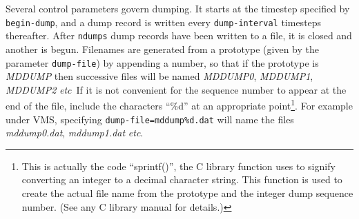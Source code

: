 \documentclass[twoside]{report}
\newcommand{\etc}{{\em etc}}
\begin{document}
Several control parameters govern dumping. It starts at the timestep
specified by \texttt{begin-dump}, and a dump record is written every
\texttt{dump-interval} timesteps thereafter.  After \texttt{ndumps} dump
records have been written to a file, it is closed and another is
begun. Filenames are generated from a prototype (given by the
parameter \texttt{dump-file}) by appending a number, so that if the
prototype is {\em MDDUMP\/} then successive files will be named
{\em MDDUMP0}, {\em MDDUMP1}, {\em MDDUMP2} \etc\
If it is not convenient for the sequence number to appear at the end
of the file, include the characters ``\%d'' at an appropriate
point\footnote{This is actually the code ``sprintf()'', the C library
function uses to signify converting an integer to a decimal character
string. This function is used to create the actual file name from the
prototype and the integer dump sequence number. (See any C library
manual for details.)}.  For example under VMS, specifying
\texttt{dump-file=mddump\%d.dat} will name the files {\em mddump0.dat},
{\em mddump1.dat\/} \etc.
\end{document}
